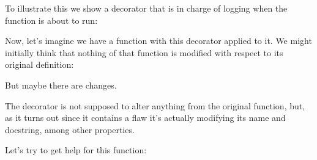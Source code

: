 \documentclass[a4paper,10pt,english]{sphinxmanual}
\begin{document}
To illustrate this we show a decorator that is in charge of logging when the function is
about to run:

\begin{sphinxVerbatim}[commandchars=\\\{\}]
 
      
         
          
 
\end{sphinxVerbatim}

Now, let’s imagine we have a function with this decorator applied to it. We might initially
think that nothing of that function is modified with respect to its original definition:

\begin{sphinxVerbatim}[commandchars=\\\{\}]
 
     
\end{sphinxVerbatim}

But maybe there are changes.

The decorator is not supposed to alter anything from the original function, but, as it turns
out since it contains a flaw it’s actually modifying its name and docstring, among other
properties.

Let’s try to get help for this function:

\begin{sphinxVerbatim}[commandchars=\\\{\}]
\end{sphinxVerbatim}
\end{document}
